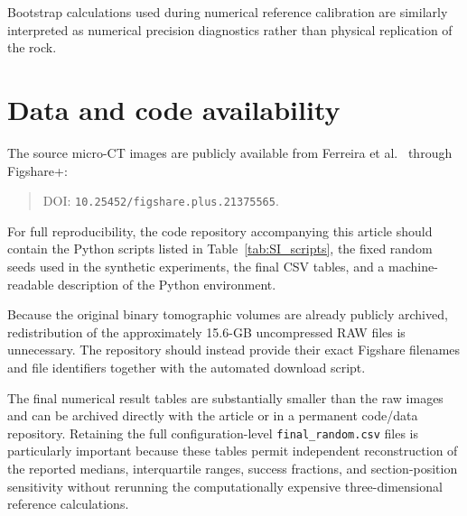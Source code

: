 \documentclass{article}
\begin{document}
Bootstrap calculations used during numerical reference calibration are
similarly interpreted as numerical precision diagnostics rather than
physical replication of the rock.

\section{Data and code availability}
\label{sec:SI_availability}

The source micro-CT images are publicly available from Ferreira
et al.~\cite{Ferreira2023} through Figshare+:

\begin{quote}
DOI: \texttt{10.25452/figshare.plus.21375565}.
\end{quote}

For full reproducibility, the code repository accompanying this article
should contain the Python scripts listed in
Table~\ref{tab:SI_scripts}, the fixed random seeds used in the synthetic
experiments, the final CSV tables, and a machine-readable description
of the Python environment.

Because the original binary tomographic volumes are already publicly
archived, redistribution of the approximately 15.6-GB uncompressed RAW
files is unnecessary. The repository should instead provide their exact
Figshare filenames and file identifiers together with the automated
download script.

The final numerical result tables are substantially smaller than the raw
images and can be archived directly with the article or in a permanent
code/data repository. Retaining the full configuration-level
\texttt{final\_random.csv} files is particularly important because these
tables permit independent reconstruction of the reported medians,
interquartile ranges, success fractions, and section-position
sensitivity without rerunning the computationally expensive
three-dimensional reference calculations.



\end{document}
